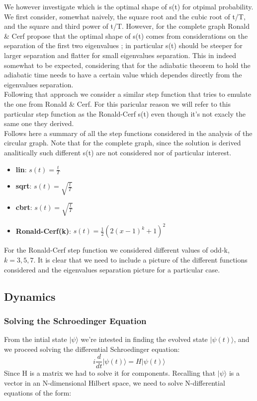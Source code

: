 We however investigate which is the optimal shape of s(t) for otpimal probability. We first consider, somewhat naively, the square root and the cubic root of t/T, and the square and third power of t/T. However, for the complete graph Ronald \& Cerf propose that the optimal shape of s(t) comes from considerations on the separation of the first two eigenvalues \cite{Roland2002}; in particular s(t) should be steeper for larger separation and flatter for small eigenvalues separation. This in indeed somewhat to be expected, considering that for the adiabatic theorem to hold the adiabatic time needs to have a certain value which dependes directly from the eigenvalues separation. \\
Following that approach we consider a similar step function that tries to emulate the one from Ronald \& Cerf. For this paricular reason we will refer to this particular step function as the Ronald-Cerf s(t) even though it's not exacly the same one they derived. \\


Follows here a summary of all the step functions considered in the analysis of the circular graph. Note that for the complete graph, since the solution is derived analitically such different s(t) are not considered nor of particular interest.
  \begin{itemize}
    \item \textbf{lin}: $s(t) = \frac{t}{T}$
    \item \textbf{sqrt}: $s(t) = \sqrt{\frac{t}{T}}$
    \item \textbf{cbrt}: $s(t) = \sqrt{\frac{t}{T}}$
    \item \textbf{Ronald-Cerf(k)}: $s(t) = \frac{1}{2}(2(x-1)^{k}+1)^2$
  \end{itemize}
For the Ronald-Cerf step function we considered different values of odd-k, $k=3,5,7$. It is clear that we need to include a picture of the different functions considered and the eigenvalues separation picture for a particular case.



\subsection{Dynamics}
\subsubsection*{Solving the Schroedinger Equation}
From the intial state $|\psi\rangle$ we're intested in finding the evolved state $|\psi(t)\rangle$, and we proceed solving the differential Schroedinger equation:
  \begin{equation}
    i\frac{d}{dt}|\psi(t)\rangle = H |\psi(t)\rangle
  \end{equation}
Since H is a matrix we had to solve it for components. Recalling that $|\psi\rangle$ is a vector in an N-dimensional Hilbert space, we need to solve N-differential equations of the form:

